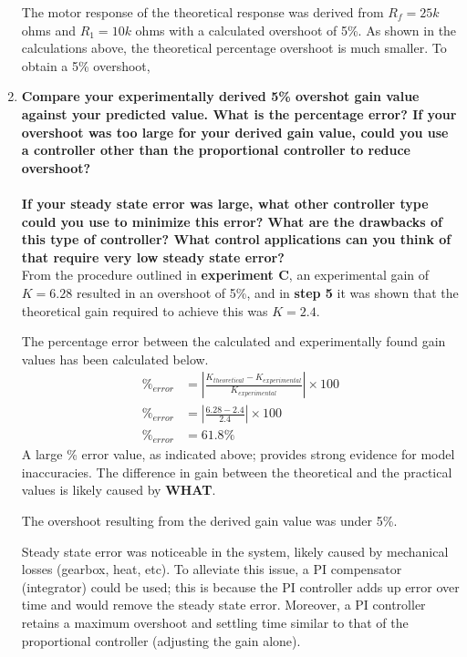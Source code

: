 \documentclass[11pt,a4paper]{article}
\begin{document}
\begin{enumerate}
	The motor response of the theoretical response was derived from $R_f = 25k$ ohms and $R_1 = 10k$ ohms with a calculated overshoot of 5\%. As shown in the calculations above, the theoretical percentage overshoot is much smaller. To obtain a 5\% overshoot, \\

    

    \pagebreak
	\item \textbf{Compare your experimentally derived 5\% overshot gain value against your predicted value. What is the percentage error? If your overshoot was too large for your derived gain value, could you use a controller other than the proportional controller to reduce overshoot? \\\\
If your steady state error was large, what other controller type could you use to minimize this error? What are  the drawbacks of  this  type of controller? What control applications can you think of that require very low steady state error?}\\

From the procedure outlined in \textbf{experiment C}, an experimental gain of $K = 6.28$ resulted in an overshoot of 5\%, and in \textbf{step 5} it was shown that the theoretical gain required to achieve this was $K = 2.4$.

The percentage error between the calculated and experimentally found gain values has been calculated below.
\begin{align*}
\%_{error} &= |\frac{K_{theoretical} - K_{experimental}}{K_{experimental}}| \times 100 \\
\%_{error} &= |\frac{6.28 - 2.4}{2.4}| \times 100 \\
\%_{error} &= 61.8\% 
\end{align*}
A large \% error value, as indicated above; provides strong evidence for model inaccuracies. The difference in gain between the theoretical and the practical values is likely caused by \textbf{WHAT}. 

The overshoot resulting from the derived gain value was under 5\%. 

Steady state error was noticeable in the system, likely caused by mechanical losses (gearbox, heat, etc). To alleviate this issue, a PI compensator (integrator) could be used; this is because the PI controller adds up error over time and would remove the steady state error. Moreover, a PI controller retains a maximum overshoot and settling time similar to that of the proportional controller (adjusting the gain alone). 


\end{enumerate}
\end{document}
